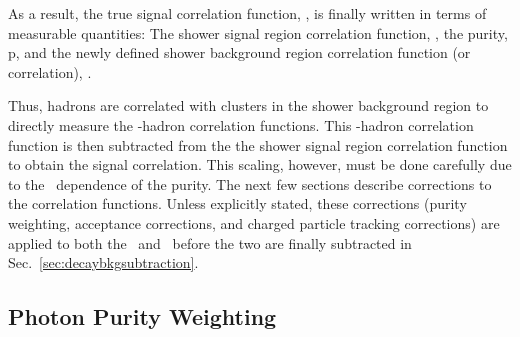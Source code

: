 As a result, the true signal correlation function, \CS, is finally written in terms of measurable quantities: The shower signal region correlation function, \CSR, the purity, p, and the newly defined shower background region correlation function (or \ydecay correlation), \CBR.

Thus, hadrons are correlated with clusters in the shower background region to directly measure the \ydecay-hadron correlation functions. This \ydecay-hadron correlation function is then subtracted from the the shower signal region correlation function to obtain the signal correlation. This scaling, however, must be done carefully due to the \pt~dependence of the purity. The next few sections describe corrections to the correlation functions. Unless explicitly stated, these corrections (purity weighting, acceptance corrections, and charged particle tracking corrections) are applied to both the \CSR~and \CBR~before the two are finally subtracted in Sec.~\ref{sec:decaybkgsubtraction}.


       





\subsection{Photon Purity Weighting}

